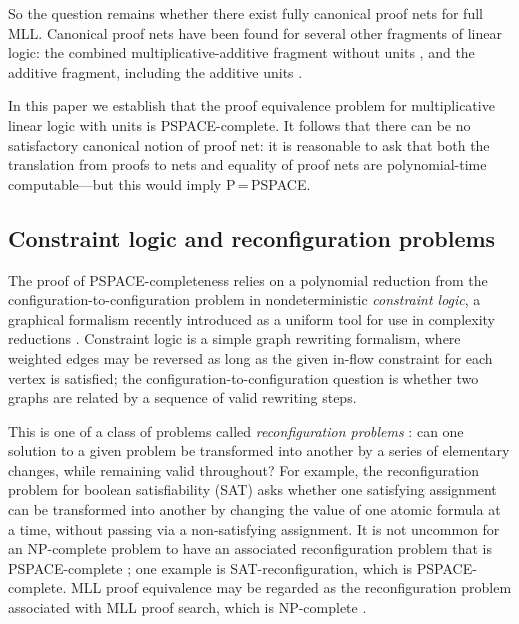 \documentclass[conference]{IEEEtran}
\let\aftersubsection=\noindent
\let\capsabbrev=\uppercase
\begin{document}
So the question remains whether there exist fully canonical proof nets for full \capsabbrev{mll}. Canonical proof nets have been found for several other fragments of linear logic: the combined multiplicative-additive fragment without units \cite{Hughes-vanGlabbeek-2005}, and the additive fragment, including the additive units \cite{Heijltjes-2011}.

In this paper we establish that the proof equivalence problem for multiplicative linear logic with units is \capsabbrev{pspace}-complete. It follows that there can be no satisfactory canonical notion of proof net: 
\color{red}
it is reasonable to ask that both the translation from proofs to nets and equality of proof nets are polynomial-time computable---but this would imply \capsabbrev{p}\,=\,\capsabbrev{pspace}.
\color{black}



\subsection*{Constraint logic and reconfiguration problems}

\aftersubsection
The proof of \capsabbrev{pspace}-completeness relies on a polynomial reduction from the configuration-to-configuration problem in nondeterministic
\emph{constraint logic}, a graphical formalism recently introduced as a uniform tool for use in complexity reductions \cite{Demaine-Hearn-2008}.
%
Constraint logic is a simple graph rewriting formalism, where weighted edges may be reversed as long as the given in-flow constraint for each vertex is satisfied; the configuration-to-configuration question is whether two graphs are related by a sequence of valid rewriting steps.

This is one of a class of problems called \emph{reconfiguration problems} \cite{ReconfigurationProblems}: can one solution to a given problem be transformed into another by a series of elementary changes, while remaining valid throughout?
%
For example, the reconfiguration problem for boolean satisfiability (SAT) asks whether one satisfying assignment can be transformed into another by changing the value of one atomic formula at a time, without passing via a non-satisfying assignment.
%
It is not uncommon for an \capsabbrev{np}-complete problem to have an associated reconfiguration problem that is \capsabbrev{pspace}-complete \cite{ReconfigurationProblems}; one example is SAT-reconfiguration, which is \capsabbrev{pspace}-complete. \capsabbrev{mll} proof equivalence may be regarded as the reconfiguration problem associated with \capsabbrev{mll} proof search, which is \capsabbrev{np}-complete \cite{Kanovich-1992,Lincoln-Winkler-1994}.
\end{document}
